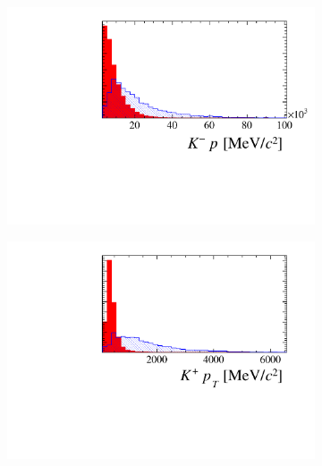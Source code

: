 \begin{figure}[!h]
\begin{subfigure}[t]{0.22\textwidth}
   \end{subfigure}
   \begin{subfigure}[t]{0.22\textwidth}
      \centering
      \includegraphics[width=1.0\textwidth]{figs/Selection/Phi_BDT_Var_Ds2KKPi_Phi_K1_P.pdf}
   \end{subfigure}
   \begin{subfigure}[t]{0.22\textwidth}
      \centering
      \includegraphics[width=1.0\textwidth]{figs/Selection/Phi_BDT_Var_Ds2KKPi_Phi_K0_PT.pdf}
   \end{subfigure}
   \begin{subfigure}[t]{0.22\textwidth}
      \centering

\end{subfigure}
\end{figure}
